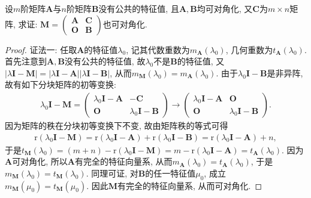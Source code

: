 \documentclass[../../main.tex]{subfiles}
\begin{document}
\begin{proposition}\label{proposition:没有公共的特征值的可对角化矩阵的分块也可对角化}
设\(m\)阶矩阵\(\boldsymbol{A}\)与\(n\)阶矩阵\(\boldsymbol{B}\)没有公共的特征值, 且\(\boldsymbol{A},\boldsymbol{B}\)均可对角化, 又\(\boldsymbol{C}\)为\(m\times n\)矩阵, 求证: \(\boldsymbol{M} = \begin{pmatrix}
\boldsymbol{A}&\boldsymbol{C}\\
\boldsymbol{O}&\boldsymbol{B}
\end{pmatrix}\)也可对角化.
\end{proposition}
\begin{proof}
{\color{blue}证法一:}
任取\(\boldsymbol{A}\)的特征值\(\lambda_0\), 记其代数重数为\(m_{\boldsymbol{A}}(\lambda_0)\), 几何重数为\(t_{\boldsymbol{A}}(\lambda_0)\). 首先注意到\(\boldsymbol{A},\boldsymbol{B}\)没有公共的特征值, 故\(\lambda_0\)不是\(\boldsymbol{B}\)的特征值, 又\(|\lambda\boldsymbol{I} - \boldsymbol{M}| = |\lambda\boldsymbol{I} - \boldsymbol{A}||\lambda\boldsymbol{I} - \boldsymbol{B}|\), 从而\(m_{\boldsymbol{M}}(\lambda_0) = m_{\boldsymbol{A}}(\lambda_0)\). 由于\(\lambda_0\boldsymbol{I} - \boldsymbol{B}\)是非异阵, 故有如下分块矩阵的初等变换:
\begin{align*}
\lambda_0\boldsymbol{I} - \boldsymbol{M} = \begin{pmatrix}
\lambda_0\boldsymbol{I} - \boldsymbol{A}&-\boldsymbol{C}\\
\boldsymbol{O}&\lambda_0\boldsymbol{I} - \boldsymbol{B}
\end{pmatrix} \to \begin{pmatrix}
\lambda_0\boldsymbol{I} - \boldsymbol{A}&\boldsymbol{O}\\
\boldsymbol{O}&\lambda_0\boldsymbol{I} - \boldsymbol{B}
\end{pmatrix}.
\end{align*}
因为矩阵的秩在分块初等变换下不变, 故由矩阵秩的等式可得
\begin{align*}
\mathrm{r}(\lambda_0\boldsymbol{I} - \boldsymbol{M}) = \mathrm{r}(\lambda_0\boldsymbol{I} - \boldsymbol{A}) + \mathrm{r}(\lambda_0\boldsymbol{I} - \boldsymbol{B}) = \mathrm{r}(\lambda_0\boldsymbol{I} - \boldsymbol{A}) + n,
\end{align*}
于是\(t_{\boldsymbol{M}}(\lambda_0) = (m + n) - \mathrm{r}(\lambda_0\boldsymbol{I} - \boldsymbol{M}) = m - \mathrm{r}(\lambda_0\boldsymbol{I} - \boldsymbol{A}) = t_{\boldsymbol{A}}(\lambda_0)\). 因为\(\boldsymbol{A}\)可对角化, 所以\(\boldsymbol{A}\)有完全的特征向量系, 从而\(m_{\boldsymbol{A}}(\lambda_0) = t_{\boldsymbol{A}}(\lambda_0)\), 于是\(m_{\boldsymbol{M}}(\lambda_0) = t_{\boldsymbol{M}}(\lambda_0)\). 同理可证, 对\(\boldsymbol{B}\)的任一特征值\(\mu_0\), 成立\(m_{\boldsymbol{M}}(\mu_0) = t_{\boldsymbol{M}}(\mu_0)\). 因此\(\boldsymbol{M}\)有完全的特征向量系, 从而可对角化.


\end{proof}
\end{document}
